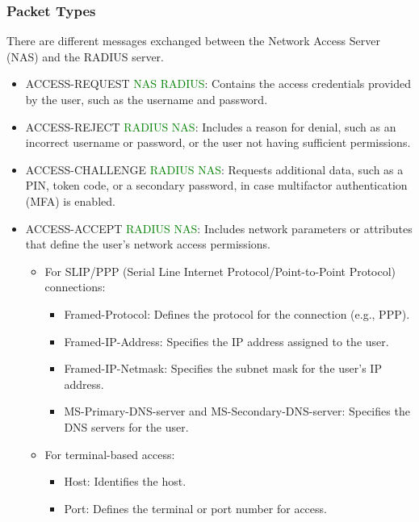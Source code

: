 \subsubsection{Packet Types}
There are different messages exchanged between the Network Access Server (NAS) and the RADIUS server.

\begin{itemize}
    \item ACCESS-REQUEST \textcolor{Green}{NAS \textrightarrow RADIUS}: Contains the access credentials provided by the user, such as the username and password.
    \item ACCESS-REJECT \textcolor{green}{RADIUS \textrightarrow NAS}: Includes a reason for denial, such as an incorrect username or password, or the user not having sufficient permissions.
    \item ACCESS-CHALLENGE \textcolor{green}{RADIUS \textrightarrow NAS}: Requests additional data, such as a PIN, token code, or a secondary password, in case multifactor authentication (MFA) is enabled.
    \item ACCESS-ACCEPT \textcolor{green}{RADIUS \textrightarrow NAS}: Includes network parameters or attributes that define the user’s network access permissions.
    \begin{itemize}
        \item For SLIP/PPP (Serial Line Internet Protocol/Point-to-Point Protocol) connections:
        \begin{itemize}
            \item Framed-Protocol: Defines the protocol for the connection (e.g., PPP).
            \item Framed-IP-Address: Specifies the IP address assigned to the user.
            \item Framed-IP-Netmask: Specifies the subnet mask for the user’s IP address.
            \item MS-Primary-DNS-server and MS-Secondary-DNS-server: Specifies the DNS servers for the user.
        \end{itemize}
        \item For terminal-based access:
        \begin{itemize}
            \item Host: Identifies the host.
            \item Port: Defines the terminal or port number for access.
        \end{itemize}
    \end{itemize}
\end{itemize}

